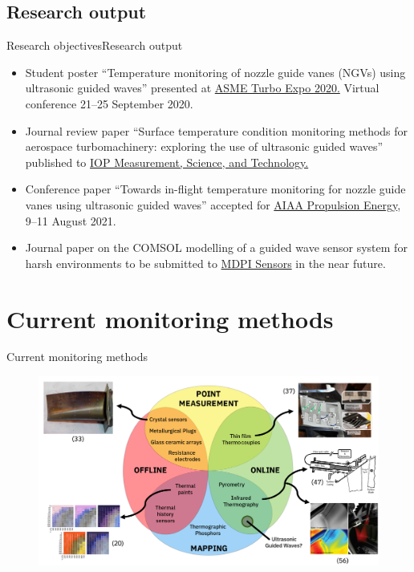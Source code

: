 \documentclass[aspectratio=169, 9pt]{beamer}
\begin{document}
\subsection{Research output}
\begin{frame}{Research objectives}{Research output}

  \begin{itemize}
    \item Student poster ``Temperature monitoring of nozzle guide vanes (NGVs) using ultrasonic guided waves'' presented at \href{https://event.asme.org/Turbo-Expo}{ASME Turbo Expo 2020.} Virtual conference 21--25 September 2020.
    \item Journal review paper ``Surface temperature condition monitoring methods for aerospace turbomachinery: exploring the use of ultrasonic guided waves'' published to \href{https://iopscience.iop.org/journal/0957-0233}{IOP Measurement, Science, and Technology.}
    \item Conference paper ``Towards in-flight temperature monitoring for nozzle guide vanes using ultrasonic guided waves'' accepted for \href{https://www.aiaa.org/propulsionenergy}{AIAA Propulsion Energy}, 9--11 August 2021.
    \item Journal paper on the COMSOL modelling of a guided wave sensor system for harsh environments to be submitted to \href{https://www.mdpi.com/journal/sensors}{MDPI Sensors} in the near future.
\end{itemize}
\end{frame}


\section{Current monitoring methods}
\begin{frame}{Current monitoring methods}

\begin{figure}
  \centering
  \includegraphics[width=\textwidth]{images/venndiagram.png}
\end{figure}
\end{frame}
\end{document}
